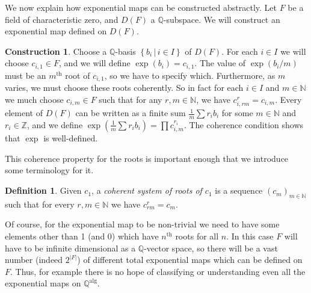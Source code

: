\documentclass[12pt]{amsart}
\theoremstyle{definition}
\newtheorem{defn}[prop]{Definition}
\newtheorem{construction}[prop]{Construction}
\begin{document}
We now explain how exponential maps can be constructed abstractly. Let $F$ be a field of characteristic zero, and $D(F)$ a ${\ensuremath{\mathbb{Q}}}$-subspace. We will construct an exponential map defined on $D(F)$.
\begin{construction}\label{E-field construction}
  Choose a {\ensuremath{\mathbb{Q}}}-basis ${\ensuremath{\left\{ {b_i} \,\left|\, {i \in I} \right.\right\}}}$ of $D(F)$. For each $i \in I$
  we will choose $c_{i,1} \in F$, and we will define $\exp(b_i) =
  c_{i,1}$.  The value of $\exp(b_i/m)$ must be an $m{{\ensuremath{{}^{\mathrm{th}}}}}$
  root of $c_{i,1}$, so we have to specify which. Furthermore, as $m$
  varies, we must choose these roots coherently. So in fact for each
  $i \in I$ and $m \in {\ensuremath{\mathbb{N}}}$ we much choose $c_{i,m} \in F$ such that
  for any $r,m \in {\ensuremath{\mathbb{N}}}$, we have $c_{i,rm}^r = c_{i,m}$. Every element
  of $D(F)$ can be written as a finite sum $\frac{1}{m}\sum r_ib_i$
  for some $m \in {\ensuremath{\mathbb{N}}}$ and $r_i \in {\ensuremath{\mathbb{Z}}}$, and we define
  $\exp(\frac{1}{m}\sum r_ib_i) = \prod c_{i,m}^{r_i}$. The coherence
  condition shows that $\exp$ is well-defined.
\end{construction}
 This coherence property for the roots is important enough that we introduce some terminology for it.
\begin{defn}
  Given $c_1$, a \emph{coherent system of roots of $c_1$} is a sequence $(c_m)_{m \in {\ensuremath{\mathbb{N}}}}$ such that for every $r,m \in {\ensuremath{\mathbb{N}}}$ we have $c_{rm}^r = c_m$.
\end{defn}

 Of course, for the exponential map to be non-trivial we need to have some elements other than 1 (and 0) which have $n^{\mathrm{th}}$ roots for all $n$. In this case $F$ will have to be infinite dimensional as a ${\ensuremath{\mathbb{Q}}}$-vector space, so there will be a vast number (indeed $2^{|F|}$) of different total exponential maps which can be defined on $F$. Thus, for example there is no hope of classifying or understanding even all the exponential maps on ${\ensuremath{\mathbb{Q}}}^{\mathrm{alg}}$. 
\end{document}
